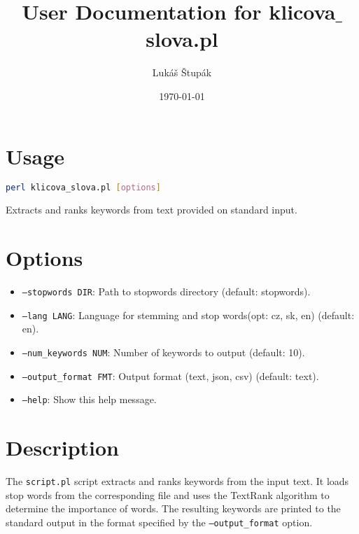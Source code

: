 \documentclass{article}
\title{User Documentation for klicova$\_$slova.pl}
\author{Lukáš Štupák}
\date{\today}
\begin{document}
\maketitle

\section{Usage}
\begin{lstlisting}[language=bash]
perl klicova_slova.pl [options]
\end{lstlisting}

Extracts and ranks keywords from text provided on standard input.

\section{Options}
\begin{itemize}
  \item \texttt{--stopwords DIR}: Path to stopwords directory (default: stopwords).
  \item \texttt{--lang LANG}: Language for stemming and stop words(opt: cz, sk, en) (default: en).
  \item \texttt{--num\_keywords NUM}: Number of keywords to output (default: 10).
  \item \texttt{--output\_format FMT}: Output format (text, json, csv) (default: text).
  \item \texttt{--help}: Show this help message.
\end{itemize}

\section{Description}
The \texttt{script.pl} script extracts and ranks keywords from the input text. It loads stop words from the corresponding file and uses the TextRank algorithm to determine the importance of words. The resulting keywords are printed to the standard output in the format specified by the \texttt{--output\_format} option.
\end{document}
